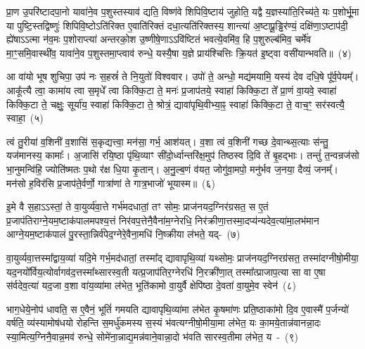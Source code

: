 प्रा॒ण उ॒परि॑ष्टादपा॒नो यावा॑ने॒व प॒शुस्तस्याव॑ द्यति॒ विष्ण॑वे शिपिवि॒ष्टाय॑ जुहोति॒ यद्वै य॒ज्ञस्या॑ति॒रिच्य॑ते॒ यः प॒शोर्भू॒मा या पुष्टि॒स्तद्विष्णुः॑ शिपिवि॒ष्टो\-ऽति॑रिक्त ए॒वाति॑रिक्तं दधा॒त्यति॑रिक्तस्य॒ शान्त्या॑ अ॒ष्टाप्रू॒ड्ढिर॑ण्यं॒ दक्षि॑णा॒\-ऽष्टाप॑दी॒ ह्ये॑षा\-ऽ\-ऽ\-त्मा न॑व॒मः प॒शोराप्त्या॑ अन्तरको॒श उ॒ष्णीषे॒णा\-ऽ\-ऽ\-वि॑ष्टितं भवत्ये॒वमि॑व॒ हि प॒शुरुल्ब॑मिव॒ चर्मे॑व मा॒ꣳ॒समि॒वास्थी॑व॒ यावा॑ने॒व प॒शुस्तमा॒प्त्वाव॑ रुन्धे॒ यस्यै॒षा य॒ज्ञे प्राय॑श्चित्तिः क्रि॒यत॑ इ॒ष्ट्वा वसी॑यान्भवति॥~(४)

{\anuvakamend[{व॒र्त॒येत्या॑ह न॒ इति॒ वै नाभ्या॒ उल्ब॑मि॒वैक॑विꣳशतिश्च}]}%

आ वा॑यो भूष शुचिपा॒ उप॑ नः स॒हस्रं॑ ते नि॒युतो॑ विश्ववार। उपो॑ ते॒ अन्धो॒ मद्य॑मयामि॒ यस्य॑ देव दधि॒षे पू᳚र्व॒पेयम्᳚। आकू᳚त्यै त्वा॒ कामा॑य त्वा स॒मृधे᳚ त्वा किक्कि॒टा ते॒ मनः॑ प्र॒जा\-प॑तये॒ स्वाहा॑ किक्कि॒टा ते᳚ प्रा॒णं वा॒यवे॒ स्वाहा॑ किक्कि॒टा ते॒ चक्षुः॒ सूर्या॑य॒ स्वाहा॑ किक्कि॒टा ते॒ श्रोत्रं॒ द्यावा॑पृथि॒वीभ्या॒ꣴ॒ स्वाहा॑ किक्कि॒टा ते॒ वाच॒ꣳ॒ सर॑स्वत्यै॒ स्वाहा॒~(५)

त्वं तु॒रीया॑ व॒शिनी॑ व॒शासि॑ स॒कृद्यत्त्वा॒ मन॑सा॒ गर्भ॒ आश॑यत्। व॒शा त्वं व॒शिनी॑ गच्छ दे॒वान्थ्स॒त्याः स॑न्तु॒ यज॑मानस्य॒ कामाः᳚। अ॒जासि॑ रयि॒ष्ठा पृ॑थि॒व्याꣳ सी॑दो॒र्ध्वान्तरि॑क्ष॒मुप॑ तिष्ठस्व दि॒वि ते॑ बृ॒हद्भाः। तन्तुं॑ त॒न्वन्रज॑सो भा॒नुमन्वि॑हि॒ ज्योति॑ष्मतः प॒थो र॑क्ष धि॒या कृ॒तान्। अ॒नु॒ल्ब॒णं व॑यत॒ जोगु॑वा॒मपो॒ मनु॑र्भव ज॒नया॒ दैव्यं॒ जनम्᳚। मन॑सो ह॒विर॑सि प्र॒जा\-प॑ते॒र्वर्णो॒ गात्रा॑णां ते गात्र॒भाजो॑ भूयास्म॥~(६)

{\anuvakamend[{सर॑स्वत्यै॒ स्वाहा॒ मनु॒स्त्रयो॑दश च}]}%

इ॒मे वै स॒हाऽऽस्तां॒ ते वा॒युर्व्य॑वा॒त्ते गर्भ॑मदधातां॒ तꣳ सोमः॒ प्राज॑नयद॒ग्निर॑ग्रसत॒ स ए॒तं प्र॒जा\-प॑तिराग्ने॒यम॒ष्टाक॑पाल\-मपश्य॒त्तं निर॑\-वप॒त्तेनै॒वैना॑म॒ग्नेरधि॒ निर॑क्रीणा॒त्तस्मा॒दप्य॑न्यदेव॒त्या॑मा॒लभ॑मान आ\-ग्ने॒य\-म॒ष्टाक॑पालं पु॒रस्ता॒न्निर्व॑पेद॒ग्ने\-रे॒वैना॒मधि॑ नि॒ष्क्रीया ल॑भते॒ यद्-~(७)

वा॒युर्व्यवा॒त्तस्मा᳚द्वाय॒व्या॑ यदि॒मे गर्भ॒मद॑धातां॒ तस्मा᳚द् द्यावा\-पृथि॒व्या॑ यथ्सोमः॒ प्राज॑नयद॒ग्निरग्र॑सत॒ तस्मा॑दग्नीषो॒मीया॒ यद॒नयो᳚र्विय॒त्योर्वागव॑द॒त्तस्मा᳚थ्सारस्व॒ती यत्प्र॒जा\-प॑तिर॒ग्नेरधि॑ नि॒र\-क्री॑णा॒त् तस्मा᳚त्प्राजाप॒त्या सा वा ए॒षा स॑र्वदेव॒त्या॑ यद॒जा व॒शा वा॑य॒व्या॑मा ल॑भेत॒ भूति॑कामो वा॒युर्वै क्षेपि॑ष्ठा दे॒वता॑ वा॒युमे॒व स्वेन॑~(८)

भाग॒धेये॒नोप॑ धावति॒ स ए॒वैनं॒ भूतिं॑ गमयति द्यावा\-पृथि॒व्या॑मा ल॑भेत कृ॒षमा॑णः प्रति॒ष्ठाका॑मो दि॒व ए॒वास्मै॑ प॒र्जन्यो॑ वर्\mbox{}षति॒ व्य॑स्यामोष॑धयो रोहन्ति स॒मर्धु॑कमस्य स॒स्यं भ॑वत्यग्नीषो॒मीया॒मा ल॑भेत॒ यः का॒मये॒तान्न॑वानन्ना॒दः स्या॒मित्य॒ग्निनै॒वान्न॒मव॑ रुन्धे॒ सोमे॑ना॒न्नाद्य॒मन्न॑वाने॒वान्ना॒दो भ॑वति सारस्व॒तीमा ल॑भेत॒ य~-~(९)


